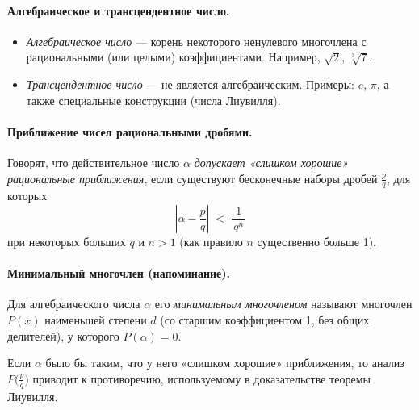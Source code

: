 
\paragraph{Алгебраическое и трансцендентное число.}
\begin{itemize}
	\item \emph{Алгебраическое число} — корень некоторого ненулевого многочлена
	      с рациональными (или целыми) коэффициентами. Например, $\sqrt{2}$, $\sqrt[3]{7}$.
	\item \emph{Трансцендентное число} — не является алгебраическим. Примеры: $e$, $\pi$,
	      а также специальные конструкции (числа Лиувилля).
\end{itemize}

\paragraph{Приближение чисел рациональными дробями.}
Говорят, что действительное число $\alpha$ \emph{допускает «слишком хорошие» рациональные приближения},
если существуют бесконечные наборы дробей $\frac{p}{q}$, для которых
\[
	\left|\alpha - \frac{p}{q}\right| \;<\; \frac{1}{\,q^n\,}
\]
при некоторых больших $q$ и $n>1$ (как правило $n$ существенно больше 1).

\bigskip

\paragraph{Минимальный многочлен (напоминание).}
Для алгебраического числа $\alpha$ его \emph{минимальным многочленом} называют многочлен
$P(x)$ наименьшей степени $d$ (со старшим коэффициентом 1, без общих делителей), у которого
$P(\alpha)=0$.

Если $\alpha$ было бы таким, что у него «слишком хорошие» приближения, то анализ $P\bigl(\tfrac{p}{q}\bigr)$ приводит к противоречию, используемому в доказательстве теоремы Лиувилля.

